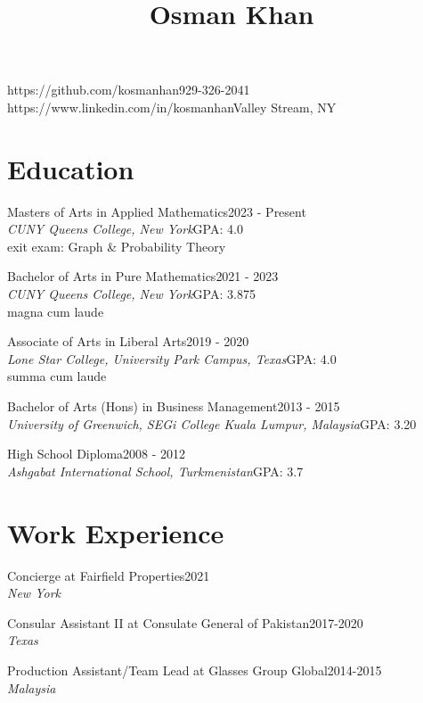 \documentclass{article}
\title{Osman Khan}
\author{}
\date{}
\begin{document}
\maketitle
\begin{flushleft}
https://github.com/kosmanhan\hfill{929-326-2041}
https://www.linkedin.com/in/kosmanhan\hfill{Valley Stream, NY}
\section*{Education}
Masters of Arts in Applied Mathematics\hfill{2023 - Present}\\
\emph{CUNY Queens College, New York}\hfill{GPA: 4.0}\\exit exam: Graph \& Probability Theory\newline 

Bachelor of Arts in Pure Mathematics\hfill{2021 - 2023}\\\emph{CUNY Queens College, New York}\hfill{GPA: 3.875}\\magna cum laude\newline

Associate of Arts in Liberal Arts\hfill{2019 - 2020}\\\emph{Lone Star College, University Park Campus, Texas}\hfill{GPA: 4.0}\\summa cum laude\newline

Bachelor of Arts (Hons) in Business Management\hfill{2013 - 2015}\\\emph{University of Greenwich, SEGi College Kuala Lumpur, Malaysia}\hfill{GPA: 3.20}\newline

High School Diploma\hfill{2008 - 2012}\\\emph{Ashgabat International School, Turkmenistan}\hfill{GPA: 3.7}
\section*{Work Experience}

Concierge at Fairfield Properties\hfill{2021}\\\emph{New York}\newline

Consular Assistant II at Consulate General of Pakistan\hfill{2017-2020}
\\\emph{Texas}\newline

Production Assistant/Team Lead at Glasses Group Global\hfill{2014-2015}\\\emph{Malaysia}\newline


\end{flushleft}
\end{document}

